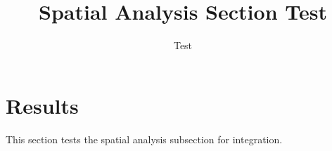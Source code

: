 \documentclass{article}
\title{Spatial Analysis Section Test}
\author{Test}
\begin{document}
\maketitle

\section{Results}

This section tests the spatial analysis subsection for integration.


\end{document}
